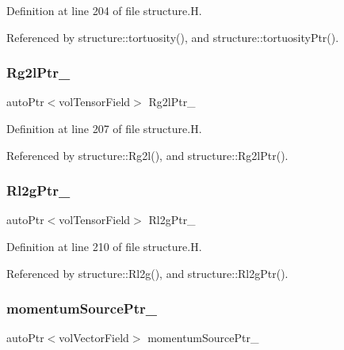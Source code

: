 Definition at line 204 of file structure.\+H.



Referenced by structure\+::tortuosity(), and structure\+::tortuosity\+Ptr().

\mbox{\label{classFoam_1_1structure_aad4be68517f93bfd5183e78b0546af58}} 
\subsubsection{\texorpdfstring{Rg2l\+Ptr\+\_\+}{Rg2lPtr\_}}
{\footnotesize\ttfamily auto\+Ptr$<$vol\+Tensor\+Field$>$ Rg2l\+Ptr\+\_\+\hspace{0.3cm}{\ttfamily [protected]}}



Definition at line 207 of file structure.\+H.



Referenced by structure\+::\+Rg2l(), and structure\+::\+Rg2l\+Ptr().

\mbox{\label{classFoam_1_1structure_a1d90e77d688e89667573d8b298559160}} 
\subsubsection{\texorpdfstring{Rl2g\+Ptr\+\_\+}{Rl2gPtr\_}}
{\footnotesize\ttfamily auto\+Ptr$<$vol\+Tensor\+Field$>$ Rl2g\+Ptr\+\_\+\hspace{0.3cm}{\ttfamily [protected]}}



Definition at line 210 of file structure.\+H.



Referenced by structure\+::\+Rl2g(), and structure\+::\+Rl2g\+Ptr().

\mbox{\label{classFoam_1_1structure_ac6ed53902f4341c29ea2143f2349ac8d}} 
\subsubsection{\texorpdfstring{momentum\+Source\+Ptr\+\_\+}{momentumSourcePtr\_}}
{\footnotesize\ttfamily auto\+Ptr$<$vol\+Vector\+Field$>$ momentum\+Source\+Ptr\+\_\+\hspace{0.3cm}{\ttfamily [protected]}}



